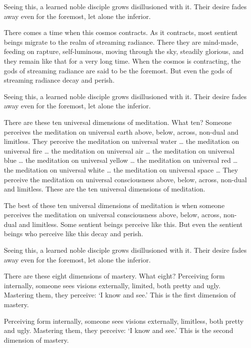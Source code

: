 \documentclass[12pt,openany]{book}%
\begin{document}
Seeing this, a learned noble disciple grows disillusioned with it. Their desire fades away even for the foremost, let alone the inferior. 

There comes a time when this cosmos contracts. As it contracts, most sentient beings migrate to the realm of streaming radiance. There they are mind-made, feeding on rapture, self-luminous, moving through the sky, steadily glorious, and they remain like that for a very long time. When the cosmos is contracting, the gods of streaming radiance are said to be the foremost. But even the gods of streaming radiance decay and perish. 

Seeing this, a learned noble disciple grows disillusioned with it. Their desire fades away even for the foremost, let alone the inferior. 

There are these ten universal dimensions of meditation. What ten? Someone perceives the meditation on universal earth above, below, across, non-dual and limitless. They perceive the meditation on universal water … the meditation on universal fire … the meditation on universal air … the meditation on universal blue … the meditation on universal yellow … the meditation on universal red … the meditation on universal white … the meditation on universal space … They perceive the meditation on universal consciousness above, below, across, non-dual and limitless. These are the ten universal dimensions of meditation. 

The best of these ten universal dimensions of meditation is when someone perceives the meditation on universal consciousness above, below, across, non-dual and limitless. Some sentient beings perceive like this. But even the sentient beings who perceive like this decay and perish. 

Seeing this, a learned noble disciple grows disillusioned with it. Their desire fades away even for the foremost, let alone the inferior. 

There are these eight dimensions of mastery. What eight? Perceiving form internally, someone sees visions externally, limited, both pretty and ugly. Mastering them, they perceive: ‘I know and see.’ This is the first dimension of mastery. 

Perceiving form internally, someone sees visions externally, limitless, both pretty and ugly. Mastering them, they perceive: ‘I know and see.’ This is the second dimension of mastery. 
\end{document}
